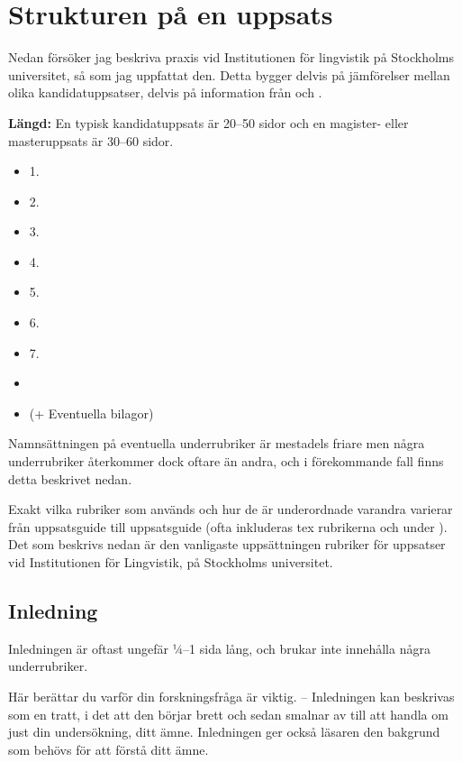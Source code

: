 
\section{Strukturen på en uppsats}
\label{struktur}

Nedan försöker jag beskriva praxis vid Institutionen för lingvistik på
Stockholms universitet, så som jag uppfattat den. Detta bygger delvis på
jämförelser mellan olika kandidatuppsatser, delvis på information från
\citet{schott+others-2007, wiren-2020} och \citet{uppsatsguide-2020}.

\textbf{Längd:} En typisk kandidatuppsats är 20--50 sidor och en magister-
eller masteruppsats är 30--60 sidor.

\begin{itemize}
\item1. 
\item2. 
\item3. 
\item4. 
\item5. 
\item6. 
\item7. 
\item{}
\item (+ Eventuella bilagor)
\end{itemize}

\noindent Namnsättningen på eventuella underrubriker är mestadels friare men
några underrubriker återkommer dock oftare än andra, och i förekommande fall
finns detta beskrivet nedan.

Exakt vilka rubriker som används och hur de är underordnade varandra varierar
från uppsatsguide till uppsatsguide (ofta inkluderas tex rubrikerna
\emph{} och \emph{} under
\emph{}). Det som beskrivs nedan är den vanligaste
uppsättningen rubriker för uppsatser vid Institutionen för Lingvistik, på
Stockholms universitet.


\subsection{Inledning}
\label{rubrik.inledning}

Inledningen är oftast ungefär ¼--1 sida lång, och brukar inte innehålla några
underrubriker.

Här berättar du varför din forskningsfråga är viktig. – Inledningen kan
beskrivas som en tratt, i det att den börjar brett och sedan smalnar av till
att handla om just din undersökning, ditt ämne. Inledningen ger också läsaren
den bakgrund som behövs för att förstå ditt ämne.

